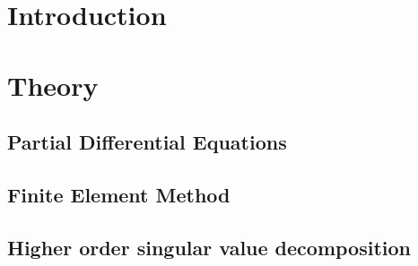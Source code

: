 \documentclass[12pt,a4paper]{scrartcl}
\numberwithin{equation}{section}
\begin{document}
\newpage
\tableofcontents

 
\newpage
\pagestyle{plain}





\section{Introduction}



%





\section{Theory}
\subsection{Partial Differential Equations}
\subsection{Finite Element Method}
\subsection{Higher order singular value decomposition}












\newpage
\begin{thebibliography}{Lam00}
\end{thebibliography}
 



\end{document}
